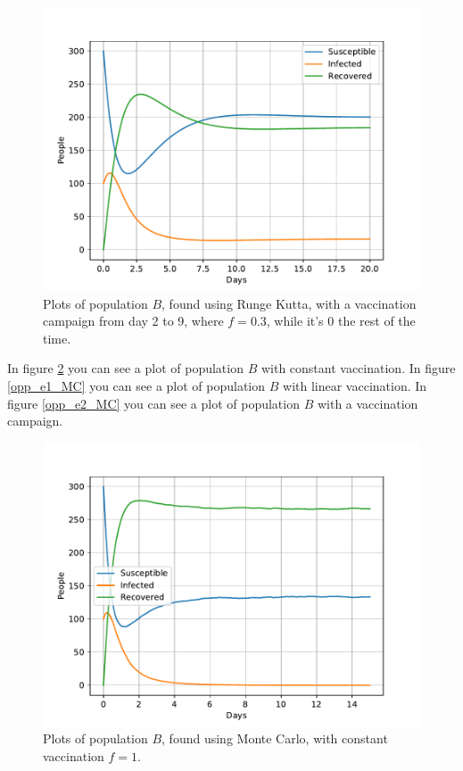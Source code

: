 \documentclass[a4paper]{article}
\begin{document}
	\begin{figure}[!htb]
		\centering 
		\includegraphics[scale=0.56]{../plots/opp_e_fb.pdf}	
		\caption{Plots of population $B$, found using Runge Kutta, with a vaccination campaign from day 2 to 9, where $f=0.3$, while it's 0 the rest of the time.}
		\label{opp_e2}
	\end{figure}

	In figure \ref{opp_e0_MC} you can see a plot of population $B$ with constant vaccination. 
	In figure \ref{opp_e1_MC} you can see a plot of population $B$ with linear vaccination. 
	In figure \ref{opp_e2_MC} you can see a plot of population $B$ with a vaccination campaign. 
	
	\begin{figure}[!htb]
		\centering 
		\includegraphics[scale=0.56]{../plots/opp_e_B0_MC.pdf}	
		\caption{Plots of population $B$, found using Monte Carlo, with constant vaccination $f=1$.}
		\label{opp_e0_MC}
	\end{figure}
	
\end{document}
